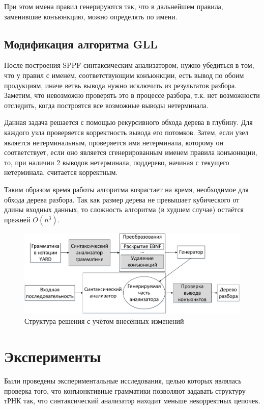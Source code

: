 \documentclass[14pt]{matmex-diploma}
\begin{document}
При этом имена правил генерируются так, что в дальнейшем правила, заменившие конъюнкцию, можно определять по имени.

\subsection{Модификация алгоритма GLL}

После построения SPPF синтаксическим анализатором, нужно убедиться в том, что у правил с именем, соответствующим конъюнкции, есть вывод по обоим продукциям, иначе ветвь вывода нужно исключить из результатов разбора. Заметим, что невозможно проверять это в процессе разбора, т.к. нет возможности отследить, когда построятся все возможные выводы нетерминала.

Данная задача решается с помощью рекурсивного обхода дерева в глубину. Для каждого узла проверяется корректность вывода его потомков. Затем, если узел является нетерминальным, проверяется имя нетерминала, которому он соответствует, если оно является сгенерированным именем правила конъюнкции, то, при наличии 2 выводов нетерминала, поддерево, начиная с текущего нетерминала, считается корректным.

Таким образом время работы алгоритма возрастает на время, необходимое для обхода дерева разбора. Так как размер дерева не превышает кубического от длины входных данных, то сложность алгоритма (в худшем случае) остаётся прежней $O(n^3)$.


\begin{figure}
\centering
\includegraphics[width=16cm]{courseworkpictures/img3.pdf}
\caption{Структура решения с учётом внесённых изменений}
\label{Структура_с_учётом_внесённых_изменений}
\end{figure}

\section{Эксперименты}

Были проведены экспериментальные исследования, целью которых являлась проверка того, что конъюнктивные грамматики позволяют задавать структуру тРНК так, что синтаксический анализатор находит меньше некорректных цепочек.
\end{document}
